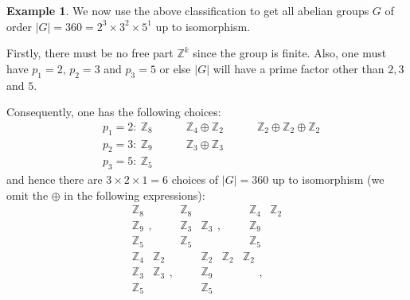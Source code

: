 \documentclass[11pt,openany]{book}
\theoremstyle{plain}
\theoremstyle{definition}
\newtheorem{example}[example]{Example}
\theoremstyle{remark}
\begin{document}
\begin{example}
    We now use the above classification to get all abelian groups $G$ of order $|G| = 360 = 2^3 \times 3^2 \times 5^1$ up to isomorphism. 

    Firstly, there must be no free part $\mathbb{Z}^k$ since the group is finite. Also, one must have $p_1 = 2$, $p_2 = 3$ and $p_3 = 5$ or else $|G|$ will have a prime factor other than $2, 3$ and $5$.

    Consequently, one has the following choices:
    \begin{align*}
    &p_1 = 2:\ \mathbb{Z}_8 \quad \quad \quad \mathbb{Z}_4 \oplus \mathbb{Z}_2 \quad \quad \quad \mathbb{Z}_2 \oplus \mathbb{Z}_2 \oplus \mathbb{Z}_2 \\
    &p_2 = 3:\ \mathbb{Z}_9 \quad \quad \quad \mathbb{Z}_3 \oplus \mathbb{Z}_3 \\
    &p_3 = 5:\ \mathbb{Z}_5 
    \end{align*}
    and hence there are $3 \times 2 \times 1 = 6$ choices of $|G| = 360$ up to isomorphism (we omit the $\oplus$ in the following expressions):
    $$\begin{matrix}
        \mathbb{Z}_8 \\
        \mathbb{Z}_9 \\
        \mathbb{Z}_5
    \end{matrix}, \quad \quad 
    \begin{matrix}
        \mathbb{Z}_8 &\\
        \mathbb{Z}_3 & \mathbb{Z}_3 \\
        \mathbb{Z}_5 &
    \end{matrix}, \quad \quad 
    \begin{matrix}
        \mathbb{Z}_4 & \mathbb{Z}_2\\
        \mathbb{Z}_9 &  \\
        \mathbb{Z}_5 &
    \end{matrix}$$
$$\begin{matrix}
        \mathbb{Z}_4 & \mathbb{Z}_2 \\
        \mathbb{Z}_3 & \mathbb{Z}_3 \\
        \mathbb{Z}_5
    \end{matrix}, \quad \quad 
    \begin{matrix}
        \mathbb{Z}_2 & \mathbb{Z}_2 & \mathbb{Z}_2 \\
        \mathbb{Z}_9 & & \\
        \mathbb{Z}_5 & &
    \end{matrix}, \quad \quad 
$$
\end{example}
\end{document}
